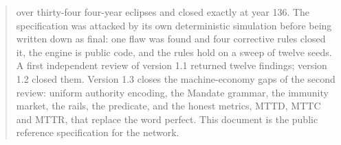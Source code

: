 \documentclass[11pt,a4paper]{article}
\begin{document}
\begin{abstract}
over thirty-four four-year eclipses and closed exactly at year 136. The
specification was attacked by its own deterministic simulation before being
written down as final: one flaw was found and four corrective rules closed
it, the engine is public code, and the rules hold on a sweep of twelve
seeds. A first independent review of version 1.1 returned twelve findings;
version 1.2 closed them. Version 1.3 closes the machine-economy gaps of
the second review: uniform authority encoding, the Mandate grammar, the
immunity market, the rails, the predicate, and the honest metrics, MTTD,
MTTC and MTTR, that replace the word perfect. This document is the public
reference specification for the network.
\end{abstract}

\vspace{4pt}
\tableofcontents
\vspace{4pt}









\end{document}
